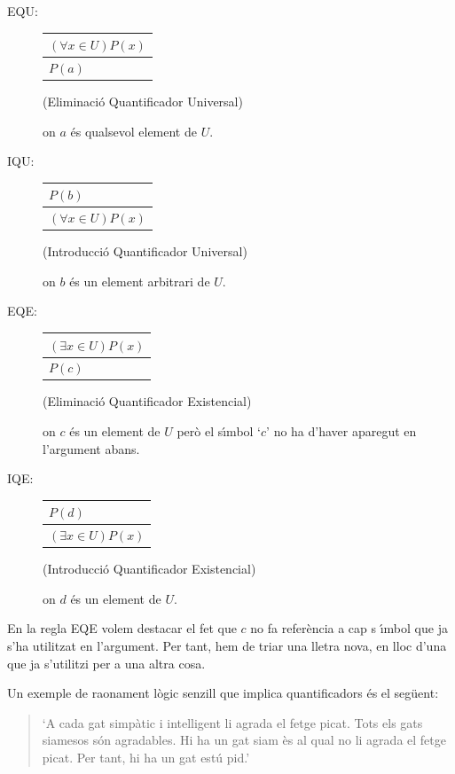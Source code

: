 \begin{description}
\item[EQU:]
\begin{tabular}{l}
$\left( \forall x\in U\right) P(x)$ \\ \hline
$P(a)$%
\end{tabular}
(Eliminaci\'{o} Quantificador Universal)

on $a$ \'{e}s qualsevol element de $U$.

\item[IQU:]
\begin{tabular}{l}
$P(b)$ \\ \hline
$\left( \forall x\in U\right) P(x)$%
\end{tabular}
(Introducci\'{o} Quantificador Universal)

on $b$ \'{e}s un element arbitrari de $U$.

\item[EQE:]
\begin{tabular}{l}
$\left( \exists x\in U\right) P(x)$ \\ \hline
$P(c)$%
\end{tabular}
(Eliminaci\'{o} Quantificador Existencial)

on $c$ \'{e}s un element de $U$ per\`{o} el s\'{\i}mbol `$c$' no ha d'haver
aparegut en l'argument abans.

\item[IQE:]
\begin{tabular}{l}
$P(d)$ \\ \hline
$\left( \exists x\in U\right) P(x)$%
\end{tabular}
(Introducci\'{o} Quantificador Existencial)

on $d$ \'{e}s un element de $U$.
\end{description}

En la regla EQE volem destacar el fet que $c$ no fa refer\`{e}ncia a cap s%
\'{\i}mbol que ja s'ha utilitzat en l'argument. Per tant, hem de triar una
lletra nova, en lloc d'una que ja s'utilitzi per a una altra cosa.

\bigskip

Un exemple de raonament l\`{o}gic senzill que implica quantificadors \'{e}s
el seg\"{u}ent:

\begin{quote}
`A cada gat simp\`{a}tic i intel\textperiodcentered ligent li agrada el
fetge picat. Tots els gats siamesos s\'{o}n agradables. Hi ha un gat siam%
\`{e}s al qual no li agrada el fetge picat. Per tant, hi ha un gat est\'{u}%
pid.'
\end{quote}

